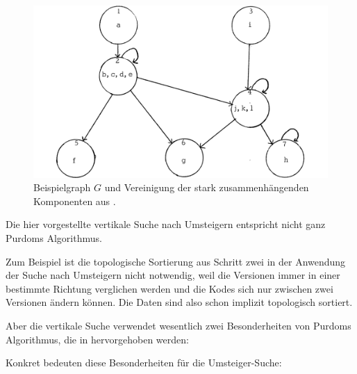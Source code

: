 \begin{figure}[H]
    \centering
    \includegraphics[width=.6\linewidth]{../img/purdom_g2.png}
    \caption{Beispielgraph $G$ und Vereinigung der stark zusammenhängenden Komponenten aus \cite[Seite 78]{purdom1970transitive}.}
\end{figure}

Die hier vorgestellte vertikale Suche nach Umsteigern entspricht nicht ganz Purdoms Algorithmus.

Zum Beispiel ist die topologische Sortierung aus Schritt zwei in der Anwendung der Suche nach Umsteigern nicht notwendig, weil die Versionen immer in einer bestimmte Richtung verglichen werden und die Kodes sich nur zwischen zwei Versionen ändern können. Die Daten sind also schon implizit topologisch sortiert. 

Aber die vertikale Suche verwendet wesentlich zwei Besonderheiten von Purdoms Algorithmus, die in \cite[Seite 76f]{dar1993augmenting} hervorgehoben werden:

\begin{figure}[H]
    \centering
    \setlength{\fboxsep}{10pt}\color{black!20}
    \normalcolor%
\end{figure}

Konkret bedeuten diese Besonderheiten für die Umsteiger-Suche:

